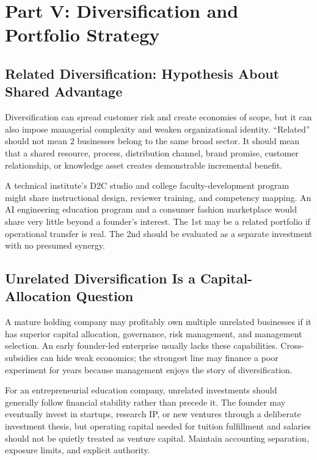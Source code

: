 \section*{Part V: Diversification and Portfolio Strategy}
\label{sec:part5_diversification_and_portfolio_strategy}

\subsection{Related Diversification: Hypothesis About Shared Advantage}
\label{sec:related_diversification_shared_advantage}

Diversification can spread customer risk and create economies of scope, but it can also impose managerial complexity and weaken organizational identity. ``Related'' should not mean 2 businesses belong to the same broad sector. It should mean that a shared resource, process, distribution channel, brand promise, customer relationship, or knowledge asset creates demonstrable incremental benefit.

A technical institute's D2C studio and college faculty-development program might share instructional design, reviewer training, and competency mapping. An AI engineering education program and a consumer fashion marketplace would share very little beyond a founder's interest. The 1st may be a related portfolio if operational transfer is real. The 2nd should be evaluated as a separate investment with no presumed synergy.

\subsection{Unrelated Diversification Is a Capital-Allocation Question}
\label{sec:unrelated_diversification_capital_allocation}

A mature holding company may profitably own multiple unrelated businesses if it has superior capital allocation, governance, risk management, and management selection. An early founder-led enterprise usually lacks these capabilities. Cross-subsidies can hide weak economics; the strongest line may finance a poor experiment for years because management enjoys the story of diversification.

For an entrepreneurial education company, unrelated investments should generally follow financial stability rather than precede it. The founder may eventually invest in startups, research IP, or new ventures through a deliberate investment thesis, but operating capital needed for tuition fulfillment and salaries should not be quietly treated as venture capital. Maintain accounting separation, exposure limits, and explicit authority.

